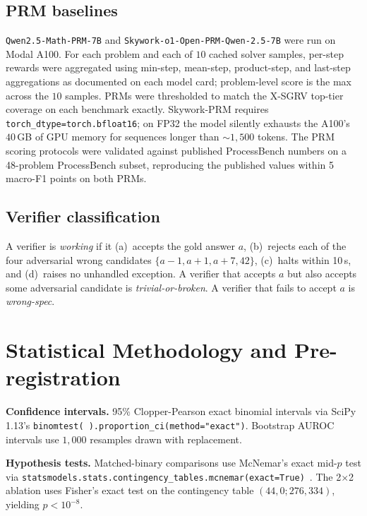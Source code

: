 \documentclass{article}
\begin{document}
\subsection{PRM baselines}
\label{app:prm}

\texttt{Qwen2.5-Math-PRM-7B} and \texttt{Skywork-o1-Open-PRM-Qwen-2.5-7B} were run on Modal A100. For each problem and each of $10$ cached solver samples, per-step rewards were aggregated using min-step, mean-step, product-step, and last-step aggregations as documented on each model card; problem-level score is the max across the $10$ samples. PRMs were thresholded to match the X-SGRV top-tier coverage on each benchmark exactly. Skywork-PRM requires \texttt{torch\_dtype=torch.bfloat16}; on FP32 the model silently exhausts the A100's $40$\,GB of GPU memory for sequences longer than $\sim1{,}500$ tokens. The PRM scoring protocols were validated against published ProcessBench numbers on a 48-problem ProcessBench subset, reproducing the published values within 5 macro-F1 points on both PRMs.

\subsection{Verifier classification}
\label{app:classify}

A verifier is \emph{working} if it (a)~accepts the gold answer $a$, (b)~rejects each of the four adversarial wrong candidates $\{a-1, a+1, a+7, 42\}$, (c)~halts within 10\,s, and (d)~raises no unhandled exception. A verifier that accepts $a$ but also accepts some adversarial candidate is \emph{trivial-or-broken}. A verifier that fails to accept $a$ is \emph{wrong-spec}.

\section{Statistical Methodology and Pre-registration}
\label{app:stats}

\textbf{Confidence intervals.} 95\% Clopper-Pearson exact binomial intervals via SciPy 1.13's \texttt{binomtest(\,).proportion\_ci(method="exact")}. Bootstrap AUROC intervals use $1{,}000$ resamples drawn with replacement.

\textbf{Hypothesis tests.} Matched-binary comparisons use McNemar's exact mid-$p$ test via \texttt{statsmodels.stats.contingency\_tables.mcnemar(exact=True)}~\citep{fagerland2013mcnemar}. The 2$\times$2 ablation uses Fisher's exact test on the contingency table $(44, 0; 276, 334)$, yielding $p<10^{-8}$.
\end{document}
